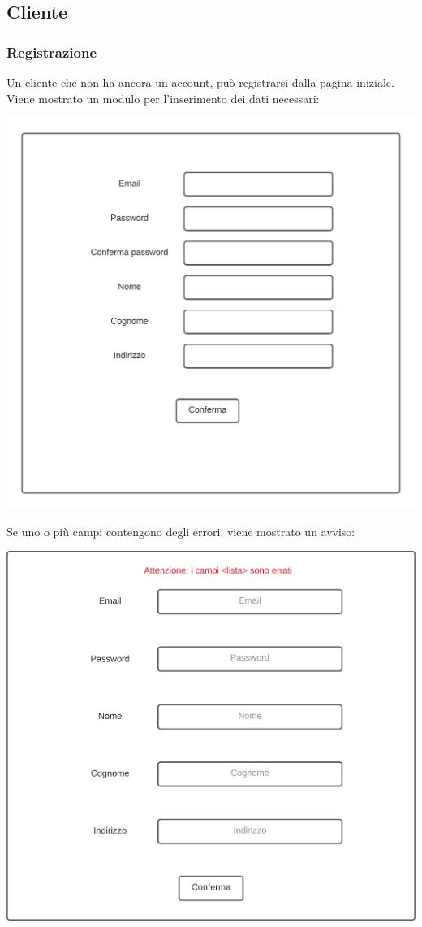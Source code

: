 \documentclass[12pt]{article}
\begin{document}
\newpage

\subsection{Cliente}
\subsubsection{Registrazione}
Un cliente che non ha ancora un account, può registrarsi dalla pagina iniziale. Viene mostrato un modulo per l'inserimento dei dati necessari:
\begin{center}
\includegraphics[height=0.3\textheight]{Mockup/Cliente/Registrazione}
\end{center}

Se uno o più campi contengono degli errori, viene mostrato un avviso:
\begin{center}
\includegraphics[height=0.3\textheight]{Mockup/Cliente/ErroreRegistrazione}
\end{center}
\end{document}
